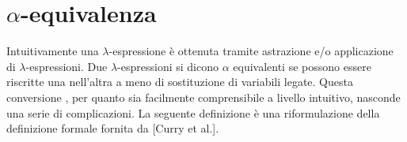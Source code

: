 \documentclass[a4paper,11pt]{article}
\theoremstyle{definition}
\newtheorem{defn}{Definizione}
\newcommand{\FF}{\mathcal{F}}
\begin{document}
\section{$\alpha$-equivalenza}
Intuitivamente una $\lambda$-espressione è ottenuta tramite astrazione e/o
applicazione di $\lambda$-espressioni. Due $\lambda$-espressioni si dicono
$\alpha$ equivalenti se possono essere riscritte una nell'altra a meno di
sostituzione di variabili legate. Questa conversione , per quanto sia
facilmente comprensibile a livello intuitivo, nasconde una serie di
complicazioni. La seguente definizione è una riformulazione della definizione formale
fornita da [Curry et al.].




%
\end{document}
